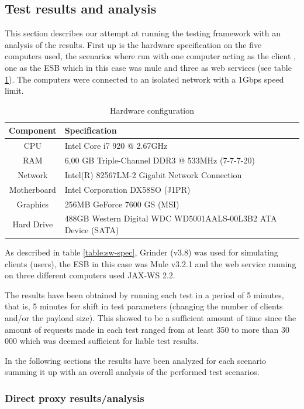 \subsection{Test results and analysis}

This section describes our attempt at running the testing framework with an analysis of the results.
First up is the hardware specification on the five computers used, the scenarios where run with one computer acting as the client , one as the ESB which in this case was mule  and three as web services (see table \ref{table:hw-spec}). 
The computers were connected to an isolated network with a 1Gbps speed limit.

\begin{table}[H]
	\caption{Hardware configuration}
	\label{table:hw-spec}
	\begin{tabular}{c l}
		Component & Specification \\ 
		\hline
		CPU & Intel Core i7 920 @ 2.67GHz  \\
		RAM &  6,00 GB Triple-Channel DDR3 @ 533MHz (7-7-7-20) \\
		Network &  Intel(R) 82567LM-2 Gigabit Network Connection \\
		Motherboard &  Intel Corporation DX58SO (J1PR) \\
		Graphics &  256MB GeForce 7600 GS (MSI) \\
		Hard Drive &  488GB Western Digital WDC WD5001AALS-00L3B2 ATA Device (SATA) \\
		\hline
	\end{tabular} 
\end{table}

As described in table \ref{table:sw-spec}, Grinder (v3.8) was used for simulating clients (users), the ESB in this case was Mule v3.2.1 and the web service running on three different computers used JAX-WS 2.2.

The results have been obtained by running each test in a period of 5 minutes, that is, 5 minutes for shift in test parameters (changing the number of clients and/or the payload size). 
This showed to be a sufficient amount of time since the amount of requests made in each test ranged from at least 350 to more than 30 000 which was deemed sufficient for liable test results. 

In the following sections the results have been analyzed for each scenario summing it up with an overall analysis of the performed test scenarios.

\subsubsection{Direct proxy results/analysis}

